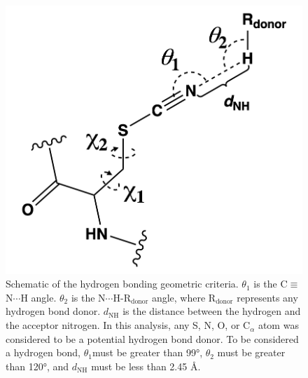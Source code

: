 \begin{figure}
    \center
    \includegraphics[width=\single]{figures-snase/hbond_schematic.png}
    \caption[Schematic of the hydrogen bonding geometric criteria]{
        Schematic of the hydrogen bonding geometric criteria. 
        $\theta_1$ is the C$\equiv$N$\cdots$H angle. 
        $\theta_2$ is the N$\cdots$H-R$_\text{donor}$ angle, where R$_\text{donor}$ represents any hydrogen bond donor. 
        $d_\text{NH}$ is the distance between the hydrogen and the acceptor nitrogen. 
        In this analysis, any S, N, O, or C$_{\alpha}$ atom was considered to be a potential hydrogen bond donor. 
        To be considered a hydrogen bond, $\theta_1$must be greater than \ang{99}, $\theta_2$ must be greater than \ang{120}, and  $d_\text{NH}$ must be less than 2.45 \si{\angstrom}.
    }
    \label{fig:snase-hbond_criteria}
\end{figure}

